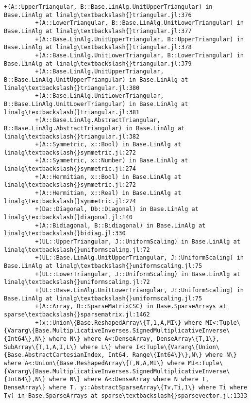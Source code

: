 \documentclass[11pt]{article}
\begin{document}
\begin{Verbatim}[commandchars=\\\{\}]
         +(A::UpperTriangular, B::Base.LinAlg.UnitUpperTriangular) in Base.LinAlg at linalg\textbackslash{}triangular.jl:376
         +(A::LowerTriangular, B::Base.LinAlg.UnitLowerTriangular) in Base.LinAlg at linalg\textbackslash{}triangular.jl:377
         +(A::Base.LinAlg.UnitUpperTriangular, B::UpperTriangular) in Base.LinAlg at linalg\textbackslash{}triangular.jl:378
         +(A::Base.LinAlg.UnitLowerTriangular, B::LowerTriangular) in Base.LinAlg at linalg\textbackslash{}triangular.jl:379
         +(A::Base.LinAlg.UnitUpperTriangular, B::Base.LinAlg.UnitUpperTriangular) in Base.LinAlg at linalg\textbackslash{}triangular.jl:380
         +(A::Base.LinAlg.UnitLowerTriangular, B::Base.LinAlg.UnitLowerTriangular) in Base.LinAlg at linalg\textbackslash{}triangular.jl:381
         +(A::Base.LinAlg.AbstractTriangular, B::Base.LinAlg.AbstractTriangular) in Base.LinAlg at linalg\textbackslash{}triangular.jl:382
         +(A::Symmetric, x::Bool) in Base.LinAlg at linalg\textbackslash{}symmetric.jl:272
         +(A::Symmetric, x::Number) in Base.LinAlg at linalg\textbackslash{}symmetric.jl:274
         +(A::Hermitian, x::Bool) in Base.LinAlg at linalg\textbackslash{}symmetric.jl:272
         +(A::Hermitian, x::Real) in Base.LinAlg at linalg\textbackslash{}symmetric.jl:274
         +(Da::Diagonal, Db::Diagonal) in Base.LinAlg at linalg\textbackslash{}diagonal.jl:140
         +(A::Bidiagonal, B::Bidiagonal) in Base.LinAlg at linalg\textbackslash{}bidiag.jl:330
         +(UL::UpperTriangular, J::UniformScaling) in Base.LinAlg at linalg\textbackslash{}uniformscaling.jl:72
         +(UL::Base.LinAlg.UnitUpperTriangular, J::UniformScaling) in Base.LinAlg at linalg\textbackslash{}uniformscaling.jl:75
         +(UL::LowerTriangular, J::UniformScaling) in Base.LinAlg at linalg\textbackslash{}uniformscaling.jl:72
         +(UL::Base.LinAlg.UnitLowerTriangular, J::UniformScaling) in Base.LinAlg at linalg\textbackslash{}uniformscaling.jl:75
         +(A::Array, B::SparseMatrixCSC) in Base.SparseArrays at sparse\textbackslash{}sparsematrix.jl:1462
         +(x::Union\{Base.ReshapedArray\{T,1,A,MI\} where MI<:Tuple\{Vararg\{Base.MultiplicativeInverses.SignedMultiplicativeInverse\{Int64\},N\} where N\} where A<:DenseArray, DenseArray\{T,1\}, SubArray\{T,1,A,I,L\} where L\} where I<:Tuple\{Vararg\{Union\{Base.AbstractCartesianIndex, Int64, Range\{Int64\}\},N\} where N\} where A<:Union\{Base.ReshapedArray\{T,N,A,MI\} where MI<:Tuple\{Vararg\{Base.MultiplicativeInverses.SignedMultiplicativeInverse\{Int64\},N\} where N\} where A<:DenseArray where N where T, DenseArray\} where T, y::AbstractSparseArray\{Tv,Ti,1\} where Ti where Tv) in Base.SparseArrays at sparse\textbackslash{}sparsevector.jl:1333

\end{Verbatim}
\end{document}
